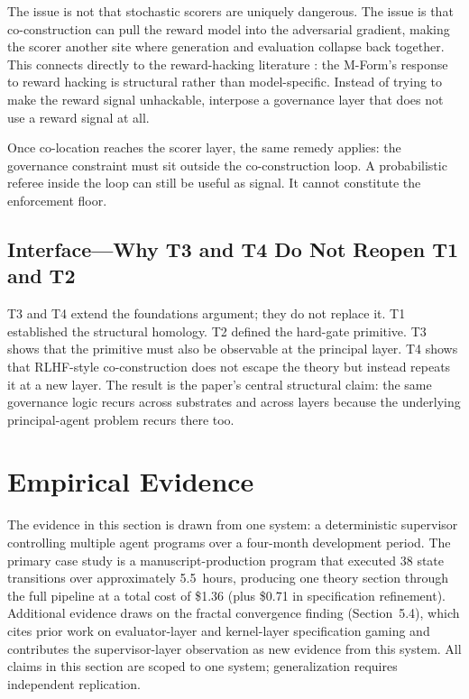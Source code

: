 \documentclass[11pt]{article}
\begin{document}
The issue is not that stochastic scorers are uniquely dangerous. The issue is that co-construction can pull the reward model into the adversarial gradient, making the scorer another site where generation and evaluation collapse back together. This connects directly to the reward-hacking literature \citep{skalse2022,casper2023}: the M-Form's response to reward hacking is structural rather than model-specific. Instead of trying to make the reward signal unhackable, interpose a governance layer that does not use a reward signal at all.

Once co-location reaches the scorer layer, the same remedy applies: the governance constraint must sit outside the co-construction loop. A probabilistic referee inside the loop can still be useful as signal. It cannot constitute the enforcement floor.

\subsection{Interface---Why T3 and T4 Do Not Reopen T1 and T2}

T3 and T4 extend the foundations argument; they do not replace it. T1 established the structural homology. T2 defined the hard-gate primitive. T3 shows that the primitive must also be observable at the principal layer. T4 shows that RLHF-style co-construction does not escape the theory but instead repeats it at a new layer. The result is the paper's central structural claim: the same governance logic recurs across substrates and across layers because the underlying principal-agent problem recurs there too.


\section{Empirical Evidence}

The evidence in this section is drawn from one system: a deterministic supervisor controlling multiple agent programs over a four-month development period. The primary case study is a manuscript-production program that executed 38 state transitions over approximately 5.5~hours, producing one theory section through the full pipeline at a total cost of \$1.36 (plus \$0.71 in specification refinement). Additional evidence draws on the fractal convergence finding (Section~5.4), which cites prior work on evaluator-layer and kernel-layer specification gaming \citep{alami2025a, alami2025b, alami2025c} and contributes the supervisor-layer observation as new evidence from this system. All claims in this section are scoped to one system; generalization requires independent replication.
\end{document}
